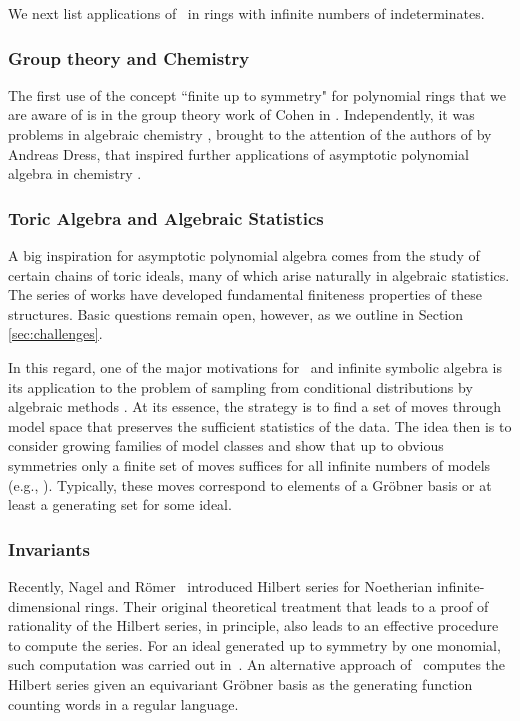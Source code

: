 
We next list applications of \EGBs\ in rings with infinite numbers of indeterminates.  

\subsubsection{Group theory and Chemistry}

The first use of the concept ``finite up to symmetry" for polynomial rings that we are aware of is in the group theory work of Cohen in \cite{cohen1967laws}.  
Independently, it was problems in algebraic chemistry \cite{ruch1967vandermondesche}, brought to the attention of the authors of \cite{aschenbrenner2007finite} by Andreas Dress, that inspired further applications of asymptotic polynomial algebra in chemistry \cite{Draisma08b}.

\subsubsection{Toric Algebra and Algebraic Statistics}

A big inspiration for asymptotic polynomial algebra comes from the study of certain chains of toric ideals, many of which arise naturally in algebraic statistics.  The series of works \cite{Hillar13, hillar2016corrigendum, draisma2013noetherianity, KKL:equivariant-markov, Krone:egb-toric} have developed fundamental finiteness properties of these structures.  Basic questions remain open, however, as we outline in Section \ref{sec:challenges}.  

In this regard, one of the major motivations for \EGBs\ and infinite symbolic algebra is its application to the problem of sampling from conditional distributions by algebraic methods \cite{diaconis1998algebraic}.  At its essence, the strategy is to find a set of moves through model space that preserves the sufficient statistics of the data.   The idea then is to consider growing families of model classes and show that up to obvious symmetries only a finite set of moves suffices for all infinite numbers of models (e.g., \cite{aoki2003minimal, santos2003higher, hocsten2007finiteness, drton2007algebraic, Draisma08b, Brouwer09e, draisma2009ideals, hillar2012finite, draisma2015finiteness}).  Typically, these moves correspond to elements of a Gr\"obner basis or at least a generating set for some ideal.

\subsubsection{Invariants}
Recently, Nagel and R\"omer~\cite{Nagel} introduced Hilbert series for Noetherian infinite-dimensional rings. Their original theoretical treatment that leads to a proof of rationality of the Hilbert series, in principle, also leads to an effective procedure to compute the series. For an ideal generated up to symmetry by one monomial, such computation was carried out in~\cite{gunturkun2016equivariant}. An alternative approach of~\cite{krone2016hilbert} computes the Hilbert series given an equivariant Gr\"obner basis as the generating function counting words in a regular language.  


